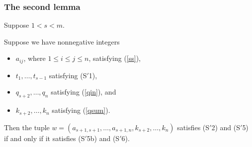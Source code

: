 \documentclass[ALCO,Unicode]{cedram}
\numberwithin{equation}{section}
\begin{document}
		\subsubsection{The second lemma} Suppose $1 < s < m$.
		\begin{lemma}\label{lemma2}Suppose we have nonnegative integers
		\begin{itemize}
			\item $a_{ij}$, where $1 \le i \le j \le n$, satisfying (\ref{ss}),
			\item $t_1, \dots, t_{s-1}$ satisfying (S$'$1),
			\item $q_{s+2}, \dots, q_n$ satisfying (\ref{qin}), and
			\item $k_{s+2}, \dots, k_n$ satisfying (\ref{qsum}).
		\end{itemize}
		Then the tuple $w=(a_{s+1,s+1}, \dots, a_{s+1,n},k_{s+2}, \dots, k_n)$ satisfies (S$'$2) and (S$'$5) if and only if it satisfies (S$'$5b) and (S$'$6).
	\end{lemma}
\end{document}
